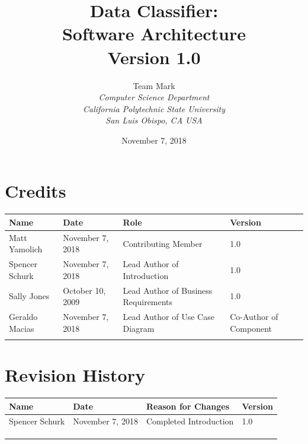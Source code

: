 \documentclass[12pt,oneside,letterpaper]{article}
\begin{document}
\title{\bfseries Data Classifier: \\
Software Architecture\\
Version 1.0}

\author {
\large{Team Mark}\\
\emph{Computer Science Department}\\
\emph{California Polytechnic State University}\\
\emph{San Luis Obispo, CA USA}\\
}

\date{November 7, 2018}
\maketitle \thispagestyle{empty}

\pagebreak
\tableofcontents



\section*{Credits}
\begin{tabular}{|l|l|p{2.5in}|l|}
\hline
\textbf{Name}&\textbf{Date}&\textbf{Role}&\textbf{Version}\\
\hline
Matt Yamolich &November 7, 2018&Contributing Member&1.0\\
\hline
Spencer Schurk&November 7, 2018&Lead Author of Introduction&1.0\\
\hline
Sally Jones&October 10, 2009&Lead Author of Business Requirements&1.0\\
\hline
Geraldo Macias&November 7, 2018&Lead Author of Use Case Diagram & Co-Author of Component&\\
\hline
&&&\\
\hline
\end{tabular}

\section*{Revision History}
\begin{tabular}{|l|l|p{2.5in}|l|}
\hline
\textbf{Name}&\textbf{Date}&\textbf{Reason for Changes}&\textbf{Version}\\
\hline
Spencer Schurk&November 7, 2018&Completed Introduction&1.0\\
\hline
&&&\\
\hline
&&&\\
\hline
&&&\\
\hline
\end{tabular}
\end{document}
